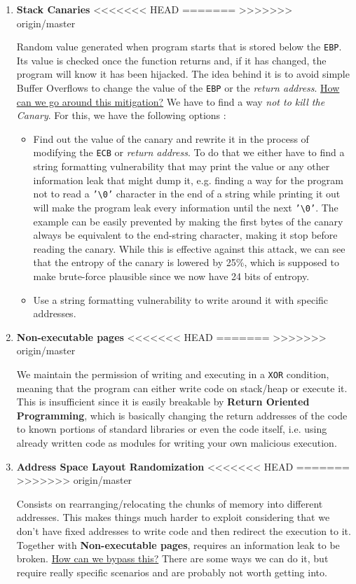 \documentclass[11pt]{article}
\begin{document}
\begin{enumerate}
\item \textbf{Stack Canaries}
<<<<<<< HEAD
\label{sec:orgb7b6927}
=======
\label{sec:org148ce99}
>>>>>>> origin/master

Random value generated when program starts that is stored below the \texttt{EBP}. Its value is checked once the function returns and, if it has changed, the program will know it has been hijacked. The idea behind it is to avoid simple Buffer Overflows to change the value of the \texttt{EBP} or the \emph{return address}. \uline{How can we go around this mitigation?} We have to find a way \emph{not to kill the Canary}. For this, we have the following options :
\begin{itemize}
\item Find out the value of the canary and rewrite it in the process of modifying the \texttt{ECB} or \emph{return address}. To do that we either have to find a string formatting vulnerability that may print the value or any other information leak that might dump it, e.g. finding a way for the program not to read a \texttt{'\textbackslash{}0'} character in the end of a string while printing it out will make the program leak every information until the next \texttt{'\textbackslash{}0'}. The example can be easily prevented by making the first bytes of the canary always be equivalent to the end-string character, making it stop before reading the canary. While this is effective against this attack, we can see that the entropy of the canary is lowered by 25\%, which is supposed to make brute-force plausible since we now have 24 bits of entropy.
\item Use a string formatting vulnerability to write around it with specific addresses.
\end{itemize}

\item \textbf{Non-executable pages}
<<<<<<< HEAD
\label{sec:org98f786a}
=======
\label{sec:orgfbd974c}
>>>>>>> origin/master

We maintain the permission of writing and executing in a \texttt{XOR} condition, meaning that the program can either write code on stack/heap or execute it. This is insufficient since it is easily breakable by \textbf{Return Oriented Programming}, which is basically changing the return addresses of the code to known portions of standard libraries or even the code itself, i.e. using already written code as modules for writing your own malicious execution.

\item \textbf{Address Space Layout Randomization}
<<<<<<< HEAD
\label{sec:orge04b036}
=======
\label{sec:org8ba99d7}
>>>>>>> origin/master

Consists on rearranging/relocating the chunks of memory into different addresses. This makes things much harder to exploit considering that we don't have fixed addresses to write code and then redirect the execution to it. Together with \textbf{Non-executable pages}, requires an information leak to be broken. \uline{How can we bypass this?} There are some ways we can do it, but require really specific scenarios \cite{muller_aslr_nodate} and are probably not worth getting into.
\end{enumerate}
\end{document}
